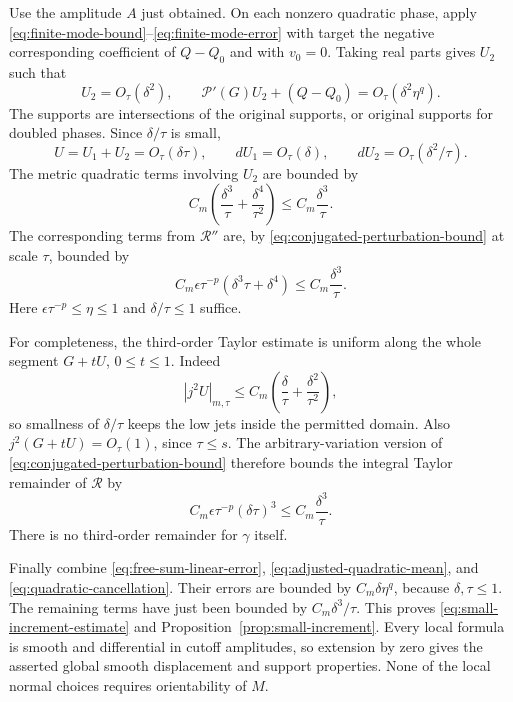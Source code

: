 Use the amplitude $A$ just obtained. On each nonzero quadratic phase, apply
\eqref{eq:finite-mode-bound}--\eqref{eq:finite-mode-error} with target the
negative corresponding coefficient of $Q-Q_0$ and with $v_0=0$. Taking real
parts gives $U_2$ such that
\begin{equation}\label{eq:quadratic-cancellation}
 U_2=O_\tau(\delta^2),\qquad
 \mathcal P'(G)U_2+(Q-Q_0)=O_\tau(\delta^2\eta^q).
\end{equation}
The supports are intersections of the original supports, or original supports
for doubled phases. Since $\delta/\tau$ is small,
\[
 U=U_1+U_2=O_\tau(\delta\tau),\qquad
 dU_1=O_\tau(\delta),\qquad dU_2=O_\tau(\delta^2/\tau).
\]
The metric quadratic terms involving $U_2$ are bounded by
\[
 C_m\left(\frac{\delta^3}{\tau}+\frac{\delta^4}{\tau^2}\right)
 \leq C_m\frac{\delta^3}{\tau}.
\]
The corresponding terms from $\mathcal R''$ are, by
\eqref{eq:conjugated-perturbation-bound} at scale $\tau$, bounded by
\[
 C_m\epsilon\tau^{-p}(\delta^3\tau+\delta^4)
 \leq C_m\frac{\delta^3}{\tau}.
\]
Here $\epsilon\tau^{-p}\leq\eta\leq1$ and $\delta/\tau\leq1$ suffice.

For completeness, the third-order Taylor estimate is uniform along the whole
segment $G+tU$, $0\leq t\leq1$. Indeed
\[
 |j^2U|_{m,\tau}\leq C_m\left(\frac \delta\tau+\frac{\delta^2}{\tau^2}\right),
\]
so smallness of $\delta/\tau$ keeps the low jets inside the permitted domain.
Also $j^2(G+tU)=O_\tau(1)$, since $\tau\leq s$. The arbitrary-variation
version of \eqref{eq:conjugated-perturbation-bound} therefore bounds the integral
Taylor remainder of $\mathcal R$ by
\[
 C_m\epsilon\tau^{-p}(\delta\tau)^3
 \leq C_m\frac{\delta^3}{\tau}.
\]
There is no third-order remainder for $\gamma$ itself.

Finally combine \eqref{eq:free-sum-linear-error},
\eqref{eq:adjusted-quadratic-mean}, and \eqref{eq:quadratic-cancellation}.
Their errors are bounded by $C_m \delta\eta^q$, because $\delta,\tau\leq1$.
The remaining terms have just been bounded by $C_m\delta^3/\tau$. This proves
\eqref{eq:small-increment-estimate} and Proposition~\ref{prop:small-increment}.
Every local formula is smooth and differential in cutoff amplitudes, so
extension by zero gives the asserted global smooth displacement and support
properties. None of the local normal choices requires orientability of $M$.

